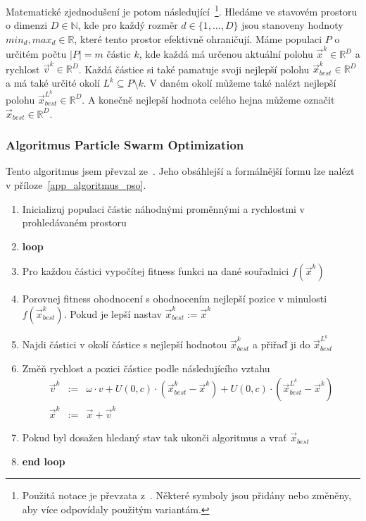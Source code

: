 \documentclass[12pt,a4paper,fleqn]{article}
\begin{document}
Matematické zjednodušení je potom následující~\footnote{Použitá notace je převzata z~\cite{sfc08}. Některé symboly jsou přidány nebo změněny, aby více odpovídaly použitým variantám.}. Hledáme ve stavovém prostoru o dimenzi $D \in \mathbb{N}$, kde pro každý rozměr $d \in \{1,\dots,D\}$ jsou stanoveny hodnoty $min_d, max_d \in \mathbb{R}$, které tento prostor efektivně ohraničují. Máme populaci $P$ o určitém počtu $|P| = m$ částic $k$, kde každá má určenou aktuální polohu $\vec{x}^k \in \mathbb{R}^D$ a rychlost $\vec{v}^k \in \mathbb{R}^D$. Každá částice si také pamatuje svoji nejlepší polohu $\vec{x}^k_{best} \in \mathbb{R}^D$ a má také určité okolí $L^k \subseteq P \setminus k$. V daném okolí můžeme také nalézt nejlepší polohu $\vec{x}^{L^k}_{best} \in \mathbb{R}^D$. A konečně nejlepší hodnota celého hejna můžeme označit $\vec{x}_{best} \in \mathbb{R}^D$.

\subsubsection*{Algoritmus Particle Swarm Optimization} \label{algoritmus_pso}
Tento algoritmus jsem převzal ze~\cite{poli2007particle}. Jeho obsáhlejší a formálnější formu lze nalézt v příloze~\ref{app_algoritmus_pso}.
\begin{enumerate}
\item Inicializuj populaci částic náhodnými proměnnými a rychlostmi v prohledávaném prostoru
\item \textbf{loop}
\item Pro každou částici vypočítej fitness funkci na dané souřadnici $f(\vec{x}^k)$
\item Porovnej fitness ohodnocení s ohodnocením nejlepší pozice v minulosti $f(\vec{x}^k_{best})$. Pokud je lepší nastav $\vec{x}^k_{best} := \vec{x}^k$
\item Najdi částici v okolí částice s nejlepší hodnotou $\vec{x}^k_{best}$ a přiřaď ji do $\vec{x}^{L^k}_{best}$
\item Změň rychlost a pozici částice podle následujícího vztahu
\begin{eqnarray} 
\vec{v}^k & := & \omega \cdot v + U(0,c) \cdot (\vec{x}^k_{best} - \vec{x}^k) + U(0,c) \cdot (\vec{x}^{L^k}_{best} -  \vec{x}^k) \label{v-algoritmus}\\
\vec{x}^k & := & \vec{x} + \vec{v}^k
\end{eqnarray}
\item Pokud byl dosažen hledaný stav tak ukonči algoritmus a vrať $\vec{x}_{best}$
\item \textbf{end loop}
\end{enumerate}
\end{document}
